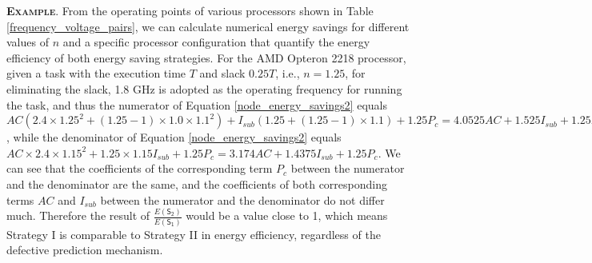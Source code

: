 \documentclass[12pt]{elsarticle}
\begin{document}
\vspace{1mm}
\noindent\textsc{\textbf{Example}}. From the operating points of various processors shown in Table \ref{frequency_voltage_pairs}, we can calculate numerical energy savings for different values of $n$ and a specific processor configuration that quantify the energy efficiency of both energy saving strategies. For the AMD Opteron 2218 processor, given a task with the execution time $T$ and slack $0.25T$, i.e., $n = 1.25$, for eliminating the slack, 1.8 GHz is adopted as the operating frequency for running the task, and thus the numerator of Equation \ref{node_energy_savings2} equals $AC\left(2.4\times1.25^2+\left(1.25-1\right)\times1.0\times1.1^2\right) + I_{sub}\left(1.25+\left(1.25-1\right)\times1.1\right) + 1.25P_c = 4.0525AC + 1.525I_{sub} + 1.25P_c$, while the denominator of Equation \ref{node_energy_savings2} equals $AC\times2.4\times1.15^2 + 1.25\times1.15I_{sub} + 1.25P_c = 3.174AC + 1.4375I_{sub} + 1.25P_c$. We can see that the coefficients of the corresponding term $P_c$ between the numerator and the denominator are the same, and the coefficients of both corresponding terms $AC$ and $I_{sub}$ between the numerator and the denominator do not differ much. Therefore the result of $\frac{E(\mathsf{S_2})}{E(\mathsf{S_1})}$ would be a value close to 1, which means \textsf{Strategy I} is comparable to \textsf{Strategy II} in energy efficiency, regardless of the defective prediction mechanism.

\begin{comment}
\begin{table}\small \centering
\caption{Frequency-Voltage Pairs for Various CPU (Unit: Frequency (GHz), Voltage (V)).}
\label{frequency_voltage_pairs}
\begin{tabular}{|c|c|c|c|c|c|c|c|c|}
\hline
\multirow{3}{*}{\begin{turn}{-90}~Gear\end{turn}} & \multicolumn{2}{|c|}{\multirow{2}{*}{AMD}} & \multicolumn{2}{|c|}{AMD Opteron} & \multicolumn{2}{|c|}{\multirow{2}{*}{Intel}} & \multicolumn{2}{|c|}{\multirow{2}{*}{AMD}}\\
& \multicolumn{2}{|c|}{\multirow{2}{*}{Opteron 2380}} & \multicolumn{2}{|c|}{846 and AMD} & \multicolumn{2}{|c|}{\multirow{2}{*}{Pentium M}} & \multicolumn{2}{|c|}{\multirow{2}{*}{Opteron 2218}}\\
& \multicolumn{2}{|c|}{} & \multicolumn{2}{|c|}{Athlon64 3200+} & \multicolumn{2}{|c|}{} & \multicolumn{2}{|c|}{}\\
\cline{2-9}
& Freq. & Volt. & Freq. & Volt. & Freq. & Volt. & Freq. & Volt.\\
\hline
0 & 2.5 & 1.35 & 2.0 & 1.5 & 1.4 & 1.484 & 2.4 & 1.25\\
\hline
1 & 1.8 & 1.2 & 1.8 & 1.4 & 1.2 & 1.436 & 2.2 & 1.20\\
\hline
2 & 1.3 & 1.1 & 1.6 & 1.3 & 1.0 & 1.308 & 1.8 & 1.15\\
\hline
3 & 0.8 & 1.025 & 0.8 & 0.9 & 0.8 & 1.180 & 1.0 & 1.10\\
\hline
\end{tabular}
\normalsize
\end{table}
\end{comment}
\end{document}
